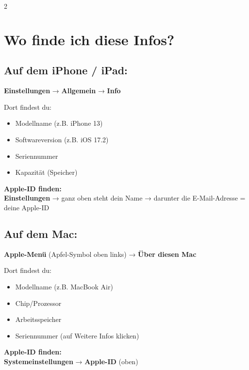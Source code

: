 \documentclass[a4paper,landscape,8pt]{extarticle}
\begin{document}
\begin{multicols}{2}
\columnbreak

\section*{Wo finde ich diese Infos?}

\subsection*{Auf dem iPhone / iPad:}

\textbf{Einstellungen} → \textbf{Allgemein} → \textbf{Info}

Dort findest du:
\begin{itemize}
\item Modellname (z.B. \glqq iPhone 13\grqq{})
\item Softwareversion (z.B. \glqq iOS 17.2\grqq{})
\item Seriennummer
\item Kapazität (Speicher)
\end{itemize}

\vspace{2mm}

\textbf{Apple-ID finden:}\\
\textbf{Einstellungen} → ganz oben steht dein Name → darunter die E-Mail-Adresse = deine Apple-ID

\vspace{4mm}

\subsection*{Auf dem Mac:}

\textbf{Apple-Menü} (Apfel-Symbol oben links) → \textbf{Über diesen Mac}

Dort findest du:
\begin{itemize}
\item Modellname (z.B. \glqq MacBook Air\grqq{})
\item Chip/Prozessor
\item Arbeitsspeicher
\item Seriennummer (auf \glqq Weitere Infos\grqq{} klicken)
\end{itemize}

\vspace{2mm}

\textbf{Apple-ID finden:}\\
\textbf{Systemeinstellungen} → \textbf{Apple-ID} (oben)

\end{multicols}
\end{document}
